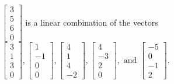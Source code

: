 \begin{exercise}
\begin{exerciseStatement}
  \end{exerciseStatement}
  \begin{exerciseAnswer}
   \(\left[\begin{array}{c}
3 \\
5 \\
6 \\
0
\end{array}\right]\) 
  	 is  
	a linear combination of the vectors \(\left[\begin{array}{c}
3 \\
1 \\
3 \\
0
\end{array}\right] , \left[\begin{array}{c}
1 \\
-1 \\
0 \\
0
\end{array}\right] , \left[\begin{array}{c}
4 \\
1 \\
4 \\
-2
\end{array}\right] , \left[\begin{array}{c}
4 \\
-3 \\
2 \\
0
\end{array}\right] , \text{ and } \left[\begin{array}{c}
-5 \\
0 \\
-1 \\
2
\end{array}\right]\).

	
  


  \end{exerciseAnswer}
\end{exercise}
